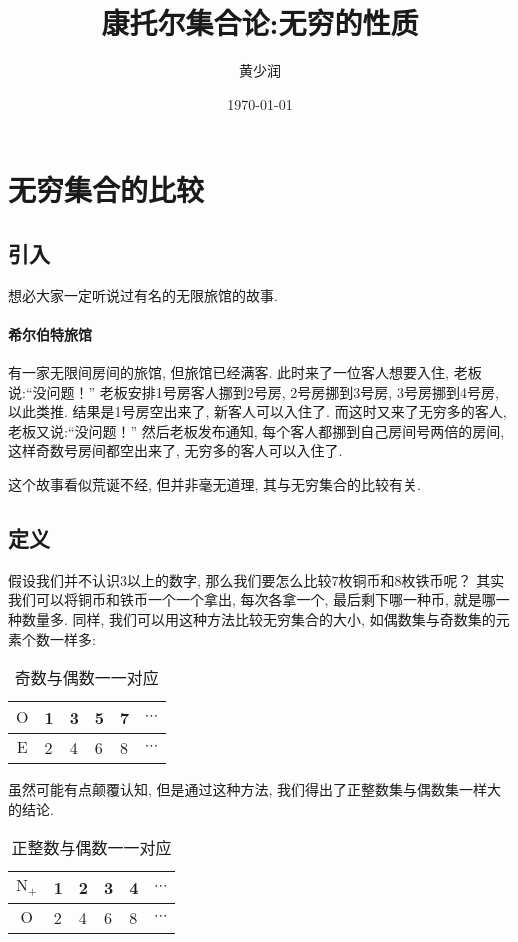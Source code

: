 \documentclass[UTF8]{mathrep}
\title{康托尔集合论:无穷的性质}
\date{\today}
\author{黄少润}
\begin{document}
\maketitle
\tableofcontents

\section{无穷集合的比较}
\subsection{引入}
想必大家一定听说过有名的无限旅馆的故事.

\paragraph{希尔伯特旅馆}
有一家无限间房间的旅馆, 但旅馆已经满客.
此时来了一位客人想要入住, 老板说:“没问题！”
老板安排1号房客人挪到2号房, 2号房挪到3号房, 3号房挪到4号房, 以此类推.
结果是1号房空出来了, 新客人可以入住了.
而这时又来了无穷多的客人, 老板又说:“没问题！”
然后老板发布通知, 每个客人都挪到自己房间号两倍的房间, 这样奇数号房间都空出来了, 无穷多的客人可以入住了.

这个故事看似荒诞不经, 但并非毫无道理, 其与无穷集合的比较有关.

\subsection{定义}
\label{defi}
假设我们并不认识$3$以上的数字, 那么我们要怎么比较$7$枚铜币和$8$枚铁币呢？
其实我们可以将铜币和铁币一个一个拿出, 每次各拿一个, 最后剩下哪一种币, 就是哪一种数量多.
同样, 我们可以用这种方法比较无穷集合的大小, 如偶数集与奇数集的元素个数一样多:
\begin{table}[!ht]
  \begin{center}
    \begin{tabular}{c|lllll}
      \toprule
      $\mathrm O$ & 1 & 3 & 5 & 7 & $\cdots$ \\
      \midrule
      $\mathrm E$ & 2 & 4 & 6 & 8 & $\cdots$ \\
      \bottomrule
    \end{tabular}
    \caption{奇数与偶数一一对应}
  \end{center}
\end{table}

虽然可能有点颠覆认知, 但是通过这种方法, 我们得出了正整数集与偶数集一样大的结论.

\begin{table}[!h]
  \begin{center}
    \begin{tabular}{c|lllll}
      \toprule
      $\mathrm N_+$ & 1 & 2 & 3 & 4 & $\cdots$ \\
      \midrule
      $\mathrm O$   & 2 & 4 & 6 & 8 & $\cdots$ \\
      \bottomrule
    \end{tabular}
    \caption{正整数与偶数一一对应}
  \end{center}
\end{table}
\end{document}
